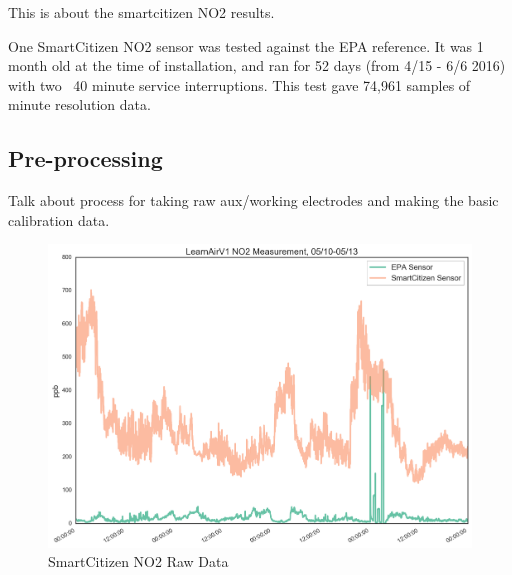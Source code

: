 This is about the smartcitizen NO2 results.

One SmartCitizen NO2 sensor was tested against the EPA reference.  It was 1 month old at the time of installation, and ran for 52 days (from 4/15 - 6/6 2016) with two ~40 minute service interruptions.  This test gave 74,961 samples of minute resolution data.


\subsection{Pre-processing}

Talk about process for taking raw aux/working electrodes and making the basic calibration data.


\begin{figure}[htb]
 	\includegraphics[width=\textwidth]{figs/no2_sck_zoomed}               
 	 \caption{SmartCitizen NO2 Raw Data}
  	\label{fig:sck_no2_raw_zoomed}
\end{figure}


